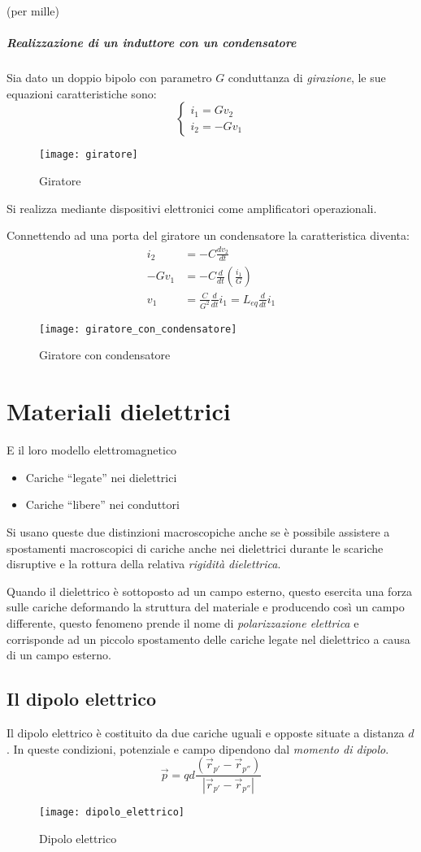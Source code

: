 (per mille)
\newpage
\subparagraph{Realizzazione di un induttore con un condensatore}
Sia dato un doppio bipolo con parametro $G$ conduttanza di
\textit{girazione}, le sue equazioni caratteristiche sono:
$$
\begin{cases}
i_1 = G v_2\\
i_2 = -G v_1
\end{cases}
$$
\begin{figure}[h!]
\centering
\texttt{[image: giratore]}
\caption{Giratore}
\end{figure}
Si realizza mediante dispositivi elettronici come 
amplificatori operazionali.

Connettendo ad una porta del giratore un condensatore la 
caratteristica diventa:
$$
\begin{aligned}
i_2 &= -C \frac{dv_2}{dt}\\
-Gv_1 &= -C\frac{d}{dt}\left(\frac{i_1}{G}\right)\\
v_1 &= \frac{C}{G^2}\frac{d}{dt}i_1 = L_{eq} \frac{d}{dt}i_1
\end{aligned}
$$
\begin{figure}[h!]
\centering
\texttt{[image: giratore\_con\_condensatore]}
\caption{Giratore con condensatore}
\end{figure}
\newpage
\section{Materiali dielettrici}
E il loro modello elettromagnetico

\begin{itemize}
 \item Cariche ``legate'' nei dielettrici
 \item Cariche ``libere'' nei conduttori
\end{itemize}
Si usano queste due distinzioni macroscopiche anche se è possibile
assistere a spostamenti macroscopici di cariche anche nei dielettrici
durante le scariche disruptive e la rottura della relativa 
\textit{rigidità dielettrica}.

Quando il dielettrico è sottoposto ad un campo esterno, questo esercita 
una forza sulle cariche deformando la struttura del materiale e 
producendo così un campo differente, questo fenomeno prende il nome
di \textit{polarizzazione elettrica} e corrisponde ad un piccolo
spostamento delle cariche legate nel dielettrico a causa di un campo
esterno.
\subsection{Il dipolo elettrico}
Il dipolo elettrico è costituito da due cariche uguali e opposte
situate a distanza $d$. In queste condizioni, potenziale e campo 
dipendono dal \textit{momento di dipolo}.
$$
\vec{p} = qd \frac{(\vec{r}_{p'}-\vec{r}_{p''})}{|\vec{r}_{p'}-\vec{r}_{p''}|}
$$
\begin{figure}[h!]
\centering
\texttt{[image: dipolo\_elettrico]}
\caption{Dipolo elettrico}
\end{figure}

